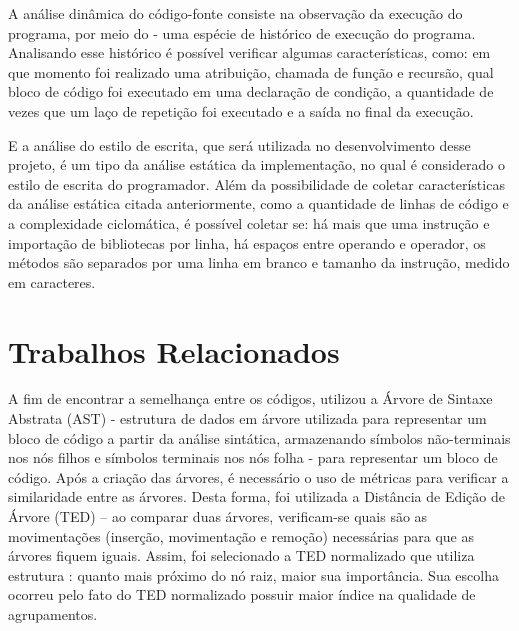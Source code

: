 		A análise dinâmica do código-fonte consiste na observação da execução do programa,
		por meio do  - uma espécie de histórico de execução do programa. Analisando
		esse histórico é possível verificar algumas características, como: em que momento foi
		realizado uma atribuição, chamada de função e recursão, qual bloco de código foi
		executado em uma declaração de condição, a quantidade de vezes que um laço de repetição
		foi executado e a saída no final da execução.
		
		E a análise do estilo de escrita, que será utilizada no desenvolvimento desse projeto,
		é um tipo da análise estática da implementação, no qual é considerado o estilo de
		escrita do programador. Além da possibilidade de coletar características da análise
		estática citada anteriormente, como a quantidade de linhas de código e a complexidade
		ciclomática, é possível coletar se: há mais que uma instrução e importação de bibliotecas
		por linha, há espaços entre operando e operador, os métodos são separados por uma linha
		em branco e tamanho da instrução, medido em caracteres.

	\section{Trabalhos Relacionados}
	\label{sectionTrab}
	
	    A fim de encontrar a semelhança entre os códigos, 
	    utilizou a Árvore de Sintaxe Abstrata (AST) - estrutura de dados em árvore
	    utilizada para representar um bloco de código a partir da análise sintática,
	    armazenando símbolos não-terminais nos nós filhos e símbolos terminais nos
	    nós folha - para representar um bloco de código. Após a criação das árvores,
	    é necessário o uso de métricas para verificar a similaridade entre as árvores.
	    Desta forma, foi utilizada a Distância de Edição de Árvore (TED) – ao comparar
	    duas árvores, verificam-se quais são as movimentações (inserção, movimentação
	    e remoção) necessárias para que as árvores fiquem iguais. Assim, foi
	    selecionado a TED normalizado que utiliza estrutura :
	    quanto mais próximo do nó raiz, maior sua importância. Sua escolha ocorreu
	    pelo fato do TED normalizado possuir maior índice na qualidade de agrupamentos.
	    
